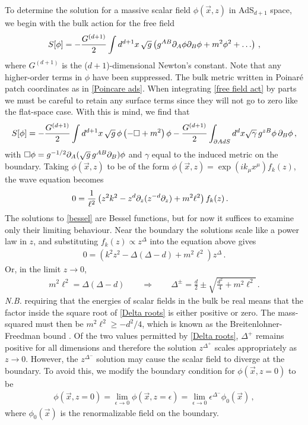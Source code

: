 \documentclass[../PhD.tex]{subfiles}
\begin{document}
To determine the solution for a massive scalar field $\phi(\vec x, z)$ in AdS$_{d+1}$ space, we begin with the bulk action for the free field
\begin{align}
\label{free field act}
S[\phi] = -\frac{G^{(d+1)}}{2} \int d^{d+1} x \, \sqrt{g} \left( g^{AB} \partial_A \phi \partial_B \phi + m^2 \phi^2 + \ldots \right) \, ,
\end{align}
where $G^{(d+1)}$ is the ($d+1$)-dimensional Newton's constant. Note that any higher-order terms in $\phi$ have been suppressed. The bulk metric written in Poinar\'e patch coordinates as in \eqref{Poincare ads}. When integrating \eqref{free field act} by parts we must be careful to retain any surface terms since they will not go to zero like the flat-space case. With this is mind, we find that
\begin{align}
\label{action int by parts}
S[\phi] = -\frac{G^{(d+1)}}{2} \int d^{d+1}x \, \sqrt{g}\, \phi \left( - \Box + m^2 \right) \phi - \frac{G^{(d+1)}}{2}\int_{\partial AdS} d^d x \sqrt{\gamma} \, g^{zB} \phi \, \partial_B \phi \, ,
\end{align}
with $\Box \phi = g^{-1/2} \partial_A (\sqrt{g} \, g^{AB} \partial_B) \phi$ and $\gamma$ equal to the induced metric on the boundary. Taking $\phi(\vec x, z)$ to be of the form $\phi(\vec x, z) = \exp( i k_\mu x^\mu) f_k (z)$, the wave equation becomes
\begin{align}
\label{bessel}
0 &= \frac{1}{\ell^2} \left( z^2 k^2 - z^{d} \partial_z (z^{-d} \partial_z ) + m^2 \ell^2 \right) f_k(z) \, .
\end{align}
The solutions to \eqref{bessel} are Bessel functions, but for now it suffices to examine only their limiting behaviour. Near the boundary the solutions scale like a power law in $z$, and substituting $f_k(z) \propto z^{\Delta}$ into the equation above gives
\begin{align}
0 = \left(k^2 z^2 - \Delta(\Delta - d) + m^2 \ell^2 \right) z^\Delta \, .
\end{align}
Or, in the limit $z \to 0$,
\begin{align}
\label{Delta roots}
m^2 \ell^2 = \Delta (\Delta - d) \qquad \Rightarrow \qquad \Delta^{\pm} = \frac{d}{2} \pm \sqrt{\frac{d^2}{4} + m^2\ell^2} \, .
\end{align}
{\it N.B.} requiring that the energies of scalar fields in the bulk be real means that the factor inside the square root of \eqref{Delta roots} is either positive or zero. The mass-squared must then be $m^2 \ell^2 \geq - d^2 /4$, which is known as the Breitenlohner-Freedman bound \cite{Breitenlohner:1982bm}. Of the two values permitted by \eqref{Delta roots}, $\Delta^+$ remains positive for all dimensions and therefore the solution $z^{\Delta^+}$ scales appropriately as $z \to 0$. However, the $z^{\Delta^-}$ solution may cause the scalar field to diverge at the boundary. To avoid this, we modify the boundary condition for $\phi(\vec x, z=0)$ to be
\begin{align}
\label{scalar bc}
\phi(\vec x, z=0) = \lim_{\epsilon \to 0} \phi(\vec x, z=\epsilon) = \lim_{\epsilon \to 0} \epsilon^{\Delta^-} \phi_0 (\vec x) \, ,
\end{align}
where $\phi_0 (\vec x)$ is the renormalizable field on the boundary. 
\end{document}

